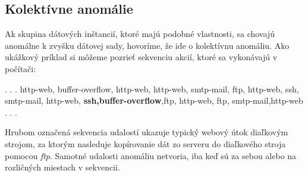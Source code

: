 \subsection{Kolektívne anomálie}
Ak skupina dátových inštancií, ktoré majú podobné vlastnosti, sa chovajú anomálne k zvyšku dátovej sady, hovoríme, že ide o kolektívnu anomáliu. Ako ukážkový príklad si môžeme pozrieť sekvenciu akcií, ktoré sa vykonávajú v počítači:\par
. . . http-web, buﬀer-overﬂow, http-web, http-web, smtp-mail, ftp, http-web, ssh, smtp-mail, http-web, \textbf{ssh,buffer-overflow},ftp, http-web, ftp, smtp-mail,http-web . . .\par
Hrubom označená sekvencia udalostí ukazuje typický webový útok diaľkovým strojom, za ktorým nasleduje kopírovanie dát zo serveru do diaľkového stroja pomocou \emph{ftp}. Samotné udalosti anomáliu netvoria, iba keď sú za sebou alebo na rozličných miestach v sekvencii.\cite{Chandola}
